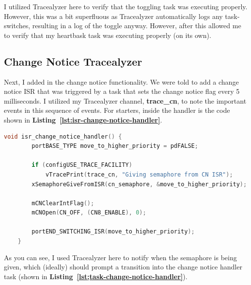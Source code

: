 \documentclass[a4paper, 12pt]{article}
\begin{document}
I utilized Tracealyzer here to verify that the toggling task was executing properly. However, this was a bit superfluous as Tracealyzer automatically logs any task-switches, resulting in a log of the toggle anyway. However, after this allowed me to verify that my heartbask task was executing properly (on its own). 

\subsection{Change Notice Tracealyzer}
Next, I added in the change notice functionality. We were told to add a change notice ISR that was triggered by a task that sets the change notice flag every 5 milliseconds. I utilized my Tracealyzer channel, \textbf{trace\_cn}, to note the important events in this sequence of events. For starters, inside the handler is the code shown in \textbf{Listing~\ref{lst:isr-change-notice-handler}}.

	\begin{mdframed}[backgroundcolor=code-gray, roundcorner=10pt,
								innerleftmargin=5, innertopmargin=5, innerbottommargin=5]	
	\begin{lstlisting}[language=C, caption=Change Notice ISR, tabsize=2, label={lst:isr-change-notice-handler}]
	void isr_change_notice_handler() {
		portBASE_TYPE move_to_higher_priority = pdFALSE;

		if (configUSE_TRACE_FACILITY)
			vTracePrint(trace_cn, "Giving semaphore from CN ISR");
		xSemaphoreGiveFromISR(cn_semaphore, &move_to_higher_priority);

		mCNClearIntFlag();
		mCNOpen(CN_OFF, (CN8_ENABLE), 0);

		portEND_SWITCHING_ISR(move_to_higher_priority);
	}
	\end{lstlisting}
	\end{mdframed}
	
As you can see, I used Tracealyzer here to notify when the semaphore is being given, which (ideally) should prompt a transition into the change notice handler task (shown in \textbf{Listing~\ref{lst;task-change-notice-handler}}).
\end{document}
